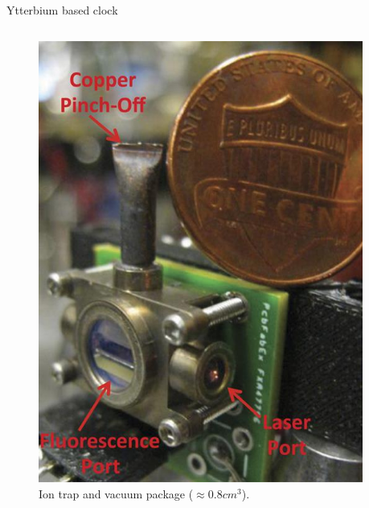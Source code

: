 \begin{frame}{Ytterbium based clock}

    \begin{columns}[c, onlytextwidth]

        \begin{column}{0.31\textwidth}

            \begin{figure}
                \centering
                \includegraphics[width=\textwidth]{img/Ytterbium-clock.jpeg}
                \caption{Ion trap and vacuum package ($\approx 0.8cm^3$).}
            \end{figure}

        \end{column}

        \hfill

        \begin{column}{0.65\textwidth}


\end{column}
\end{columns}
\end{frame}
